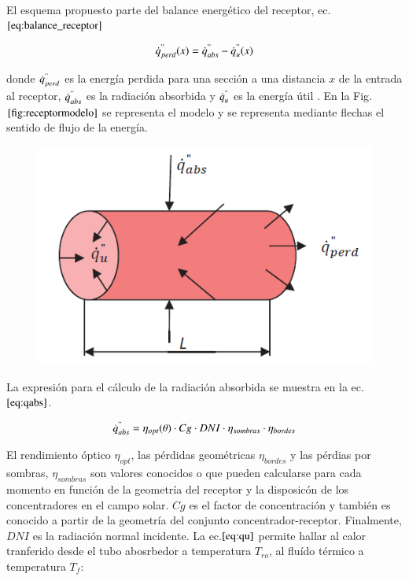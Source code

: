 \documentclass[12pt]{report} %
\begin{document}
El esquema propuesto parte del balance energético del receptor, ec.\(\eqref{eq:balance_receptor}\)

\begin{equation}
    \dot{q}^{"}_{perd}(x) = \dot{q}^{"}_{abs}-\dot{q}^{"}_{u}(x) \label{eq:balance_receptor}
\end{equation}

donde \(\dot{q}^{"}_{perd}\) es la energía perdida para una sección a una distancia \(x\) de la entrada al receptor, \(\dot{q}^{"}_{abs}\) es la radiación absorbida y \(\dot{q}^{"}_{u}\) es la energía útil . En la Fig.\(\ref{fig:receptormodelo}\) se representa el modelo y se representa mediante flechas el sentido de flujo de la energía.

\begin{figure}[H]
	{\includegraphics[scale=0.8]{images/receptor_para_modelo.png}}
	{\label{fig:receptormodelo}}
\end{figure}


La expresión para el cálculo de la radiación absorbida se muestra en la ec.\(\eqref{eq:qabs}\). 

\begin{equation}
    \dot{q}^{"}_{abs}= \eta_{opt}(\theta) \cdot Cg \cdot DNI \cdot \eta_{sombras} \cdot \eta_{bordes} \label{eq:qabs}
\end{equation}

El rendimiento óptico \(\eta_{opt}\), las pérdidas geométricas \(\eta_{bordes}\) y las pérdias por sombras, \(\eta_{sombras}\) son valores conocidos o que pueden calcularse para cada momento en función de la geometría del receptor y la disposicón de los concentradores en el campo solar. \(Cg\) es el factor de concentración y también es conocido a partir de la geometría del conjunto concentrador-receptor. Finalmente, \(DNI\) es la radiación normal incidente. La ec.\(\eqref{eq:qu}\) permite hallar al calor tranferido desde el tubo abosrbedor a temperatura \(T_{ro}\), al fluído térmico a temperatura \(T_{f}\):
\end{document}
